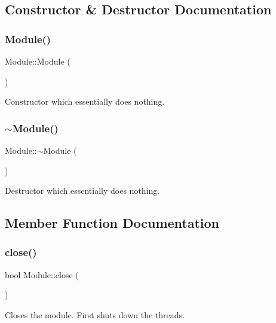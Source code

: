 \subsection{Constructor \& Destructor Documentation}
\hypertarget{classModule_a5a240a8a9ab1813b17bcb810b24ceaea}{}\label{classModule_a5a240a8a9ab1813b17bcb810b24ceaea} 
\subsubsection{\texorpdfstring{Module()}{Module()}}
{\footnotesize\ttfamily Module\+::\+Module (\begin{DoxyParamCaption}{ }\end{DoxyParamCaption})}

Constructor which essentially does nothing. \hypertarget{classModule_a7c9d9c096786d127590fdd8aa2b7d681}{}\label{classModule_a7c9d9c096786d127590fdd8aa2b7d681} 
\subsubsection{\texorpdfstring{$\sim$\+Module()}{~Module()}}
{\footnotesize\ttfamily Module\+::$\sim$\+Module (\begin{DoxyParamCaption}{ }\end{DoxyParamCaption})}

Destructor which essentially does nothing. 

\subsection{Member Function Documentation}
\hypertarget{classModule_ab07583e4393148dfe0fd2ae6e7998a4b}{}\label{classModule_ab07583e4393148dfe0fd2ae6e7998a4b} 
\subsubsection{\texorpdfstring{close()}{close()}}
{\footnotesize\ttfamily bool Module\+::close (\begin{DoxyParamCaption}{ }\end{DoxyParamCaption})}

Closes the module. First shuts down the threads. \hypertarget{classModule_a1f18c762538086e1304ea18e00e51abb}{}\label{classModule_a1f18c762538086e1304ea18e00e51abb} 
